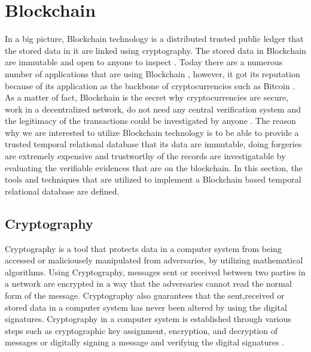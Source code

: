	\section{Blockchain} \label{sec:blockchain}
		In a big picture, Blockchain technology is a distributed trusted public ledger that the stored data in it are linked using cryptography. The stored data in Blockchain are immutable and open to anyone to inspect \cite{OECD2016Science}. Today there are a numerous number of applications that are using Blockchain \cite{dhillon2017blockchain}, however, ‌it got its reputation because of its application as the backbone of cryptocurrencies such as Bitcoin \cite{nakamoto2008bitcoin}. As a matter of fact, Blockchain is the secret why cryptocurrencies are secure, work in a decentralized network, do not need any central verification system and the legitimacy of the transactions could be investigated by anyone \cite{halaburda2016beyond}.
		The reason why we are interested to utilize Blockchain technology is to be able to provide a trusted temporal relational database that its data are immutable, doing forgeries are extremely expensive and trustworthy of the records are investigatable by evaluating the verifiable evidences that are on the blockchain. In this section, the tools and techniques that are utilized to implement a Blockchain based temporal relational database are defined.

		\subsection{Cryptography} \label{sec:cryptography}
			Cryptography is a tool that protects data in a computer system from being accessed or maliciousely manipulated from adversaries, by utilizing mathematical algorithms. Using Cryptography, messages sent or received between two parties in a network are encrypted in a way that the adversaries cannot read the normal form of the message. Cryptography also guarantees that the sent,received or stored data in a computer system has never been altered by using the digital signatures. Cryptography in a computer system is established through various steps such as cryptographic key assignment, encryption, and decryption of messages or digitally signing a message and verifying the digital signatures \cite{stallings2017cryptography}.

